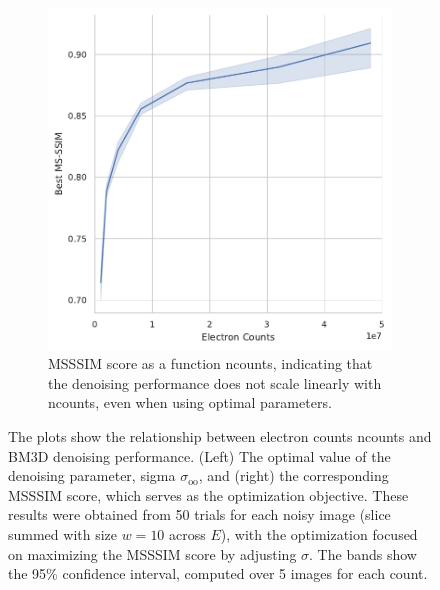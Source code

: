 \begin{figure}
\begin{subfigure}[t]{0.49\linewidth}
        \includegraphics[width=\linewidth]{images/hyperparameter_msssim_averaged_10_images.pdf}
        \caption{\gls{MSSSIM} score as a function \gls{ncounts}, indicating that the denoising performance does not scale linearly with \gls{ncounts}, even when using optimal parameters.}
        \label{fig:hyperparameter-msssim-averaged-10-images}
    \end{subfigure}
    \caption{The plots show the relationship between electron counts \gls{ncounts} and \gls{BM3D} denoising performance. (Left) The optimal value of the denoising parameter, sigma $\sigma_{\text{oo}}$, and (right) the corresponding \gls{MSSSIM} score, which serves as the optimization objective. These results were obtained from \num{50} trials for each noisy image (slice summed with size $w=10$ across $E$), with the optimization focused on maximizing the \gls{MSSSIM} score by adjusting $\sigma$. The bands show the \num{95}\% confidence interval, computed over \num{5} images for each count.}
    \label{fig:hyperparameter-averaged-10-images}
\end{figure}

